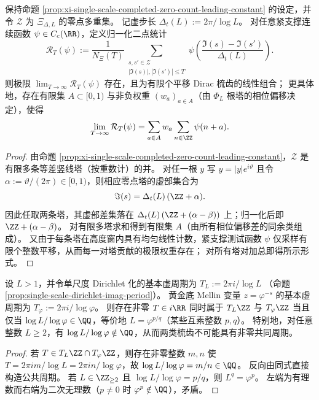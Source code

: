\begin{proposition}\label{prop:xi-single-scale-two-point-correlation-comb}
保持命题 \ref{prop:xi-single-scale-completed-zero-count-leading-constant} 的设定，并令 \(\mathcal Z\) 为 \(\Xi_{\Delta,L}\) 的零点多重集。
记虚步长
\(
\Delta_t(L):=2\pi/\log L
\)。
对任意紧支撑连续函数 \(\psi\in C_c(\RR)\)，定义归一化二点统计
\[
\mathcal R_T(\psi)
:=\frac{1}{N_{\Xi}(T)}
\sum_{\substack{s,s'\in\mathcal Z\\ |\Im(s)|,|\Im(s')|\le T}}
\psi\!\left(\frac{\Im(s)-\Im(s')}{\Delta_t(L)}\right).
\]
则极限 \(\lim_{T\to\infty}\mathcal R_T(\psi)\) 存在，且为有限个平移 Dirac 梳齿的线性组合；
更具体地，存在有限集 \(A\subset[0,1)\) 与非负权重 \((w_a)_{a\in A}\)（由 \(\Phi_L\) 根塔的相位偏移决定），使得
\[
\lim_{T\to\infty}\mathcal R_T(\psi)
=\sum_{a\in A} w_a\sum_{n\in\ZZ}\psi(n+a).
\]
\end{proposition}

\begin{proof}
由命题 \ref{prop:xi-single-scale-completed-zero-count-leading-constant}，\(\mathcal Z\) 是有限多条等差竖线塔（按重数计）的并。
对任一根 \(y\) 写 \(y=|y|e^{i\vartheta}\) 且令 \(\alpha:=\vartheta/(2\pi)\in[0,1)\)，则相应零点塔的虚部集合为
\[
\Im(s)=\Delta_t(L)\,(\ZZ+\alpha).
\]
因此任取两条塔，其虚部差集落在
\(
\Delta_t(L)\,(\ZZ+(\alpha-\beta))
\)
上；归一化后即 \(\ZZ+(\alpha-\beta)\)。
对有限多塔求和得到有限集 \(A\)（由所有相位偏移差的同余类组成）。
又由于每条塔在高度窗内具有均匀线性计数，紧支撑测试函数 \(\psi\) 仅采样有限个整数平移，从而每一对塔贡献的极限权重存在；
对所有塔对加总即得所示形式。
\end{proof}

\begin{proposition}\label{prop:xi-comb-incommensurability-logL-logphi}
设 \(L>1\)，并令单尺度 Dirichlet 化的基本虚周期为
\(
T_L:=2\pi i/\log L
\)
（命题 \ref{prop:single-scale-dirichlet-imag-period}）。
黄金底 Mellin 变量 \(z=\varphi^{-s}\) 的基本虚周期为
\(
T_\varphi:=2\pi i/\log\varphi
\)。
则存在非零 \(T\in i\RR\) 同时属于 \(T_L\ZZ\) 与 \(T_\varphi\ZZ\) 当且仅当 \(\log L/\log\varphi\in\QQ\)，等价地 \(L=\varphi^{p/q}\)（某些互素整数 \(p,q\)）。
特别地，对任意整数 \(L\ge 2\)，有 \(\log L/\log\varphi\notin\QQ\)，从而两类梳齿不可能具有非零共同周期。
\end{proposition}

\begin{proof}
若 \(T\in T_L\ZZ\cap T_\varphi\ZZ\)，则存在非零整数 \(m,n\) 使
\(
T=2\pi i m/\log L=2\pi i n/\log\varphi
\)，故 \(\log L/\log\varphi=m/n\in\QQ\)。
反向由同式直接构造公共周期。
若 \(L\in\ZZ_{\ge2}\) 且 \(\log L/\log\varphi=p/q\)，则 \(L^q=\varphi^p\)。
左端为有理数而右端为二次无理数（\(p\neq 0\) 时 \(\varphi^p\notin\QQ\)），矛盾。
\end{proof}

